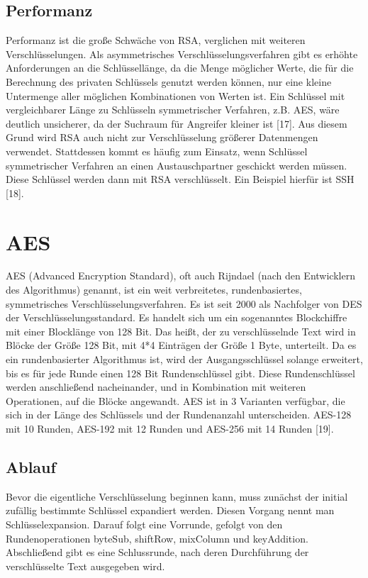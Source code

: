 \documentclass[conference,10pt,a4paper,twocolumn]{IEEEtran}
\begin{document}
\subsection{Performanz}
Performanz ist die große Schwäche von RSA, verglichen mit weiteren Verschlüsselungen. Als asymmetrisches Verschlüsselungsverfahren gibt es erhöhte Anforderungen an die Schlüssellänge, da die Menge möglicher Werte, die für die Berechnung des privaten Schlüssels genutzt werden können, nur eine kleine Untermenge aller möglichen Kombinationen von Werten ist. Ein Schlüssel mit vergleichbarer Länge zu Schlüsseln symmetrischer Verfahren, z.B. AES, wäre deutlich unsicherer, da der Suchraum für Angreifer kleiner ist [17]. Aus diesem Grund wird RSA auch nicht zur Verschlüsselung größerer Datenmengen verwendet. Stattdessen kommt es häufig zum Einsatz, wenn Schlüssel symmetrischer Verfahren an einen Austauschpartner geschickt werden müssen. \linebreak
Diese Schlüssel werden dann mit RSA verschlüsselt. Ein Beispiel hierfür ist SSH [18].


\section{AES}
AES (Advanced Encryption Standard), oft auch Rijndael (nach den Entwicklern des Algorithmus) genannt, ist ein weit verbrei{\-}tetes, rundenbasiertes, symmetrisches Verschlüsselungsverfahren. Es ist seit 2000 als Nachfolger von DES der Verschlüsselungsstandard. Es handelt sich um ein sogenanntes Blockchiffre mit einer Blocklänge von 128 Bit. Das heißt, der zu verschlüsselnde Text wird in Blöcke der Größe 128 Bit, mit 4*4 Einträgen der Größe 1 Byte, unterteilt. Da es ein rundenbasierter Algorithmus ist, wird der Ausgangsschlüssel solange erweitert, bis es für jede Runde einen 128 Bit Rundenschlüssel gibt. Diese Rundenschlüssel werden anschließend nacheinander, und in Kombination mit weiteren Operationen, auf die Blöcke angewandt. AES ist in 3 Varianten verfügbar, die sich in der Länge des Schlüssels und der Rundenanzahl unterscheiden. AES-128 mit 10 Runden, AES-192 mit 12 Runden und AES-256 mit 14 Runden [19].

\subsection{Ablauf}
Bevor die eigentliche Verschlüsselung beginnen kann, muss zunächst der initial zufällig bestimmte Schlüssel expandiert werden. Diesen Vorgang nennt man Schlüsselexpansion. Darauf folgt eine Vorrunde, gefolgt von den Rundenoperationen byteSub, shiftRow, mixColumn und keyAddition. Abschließend gibt es eine Schlussrunde, nach deren Durchführung der verschlüsselte Text ausgegeben wird.
\end{document}
